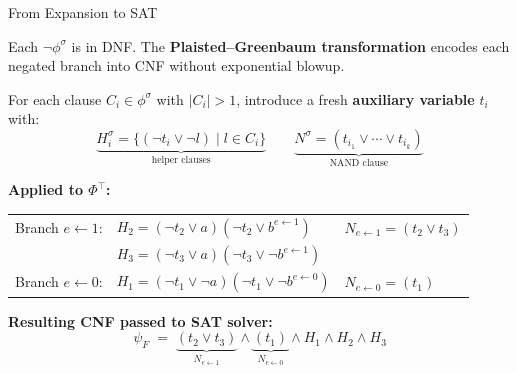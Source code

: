 \documentclass[utf8,aspectratio=169,ngerman,english]{beamer}
\begin{document}
    
    \begin{frame}{From Expansion to SAT}
    
    \tiny
    
    Each $\neg\phi^\sigma$ is in DNF. The \textbf{Plaisted--Greenbaum transformation} encodes each negated branch into CNF without exponential blowup.
    
    For each clause $C_i \in \phi^\sigma$ with $|C_i| > 1$, introduce a fresh \textbf{auxiliary variable} $t_i$ with:
    \[
        \underbrace{H_i^\sigma = \{(\neg t_i \vee \neg l) \mid l \in C_i\}}_{\text{helper clauses}} \qquad
        \underbrace{N^\sigma = (t_{i_1} \vee \cdots \vee t_{i_k})}_{\text{NAND clause}}
    \]
    
    \medskip
    \textbf{Applied to $\Phi^\top$:}
    
    \smallskip
    \begin{tabular}{lll}
        Branch $e \leftarrow 1$: & $H_2 = (\neg t_2 \vee a)(\neg t_2 \vee b^{e\leftarrow 1})$ & $N_{e\leftarrow 1} = (t_2 \vee t_3)$ \\
                                  & $H_3 = (\neg t_3 \vee a)(\neg t_3 \vee \neg b^{e\leftarrow 1})$ & \\[4pt]
        Branch $e \leftarrow 0$: & $H_1 = (\neg t_1 \vee \neg a)(\neg t_1 \vee \neg b^{e\leftarrow 0})$ & $N_{e\leftarrow 0} = (t_1)$ \\
    \end{tabular}
    
    \medskip
    \textbf{Resulting CNF passed to SAT solver:}
    \[
        \psi_F \;=\; \underbrace{(t_2 \vee t_3)}_{N_{e\leftarrow 1}} \wedge \underbrace{(t_1)}_{N_{e\leftarrow 0}} \wedge H_1 \wedge H_2 \wedge H_3
    \]
    
    \end{frame}
\fi
\end{document}
